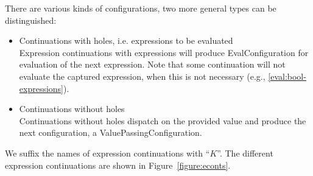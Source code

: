\documentclass{article}
\begin{document}
There are various kinds of configurations, two more general types can be distinguished:
\begin{itemize}
\item Continuations with holes, i.e. expressions to be evaluated\\
Expression continuations with expressions will produce EvalConfiguration for evaluation of the next expression.
Note that some continuation will not evaluate the captured expression, when this is not necessary (e.g., \ref{eval:bool-expressions}).

\item Continuations without holes\\
Continuations without holes dispatch on the provided value and produce the next configuration, a ValuePassingConfiguration.
\end{itemize}
We suffix the names of expression continuations with ``$K$''.
The different expression continuations are shown in Figure~\ref{figure:econts}.
%
\newcommand{\ExceptionHandlersRest}{\handler,\,\cstrace,\,\cex}
\newcommand{\ExceptionHandlers}{\strace,\,\handler,\,\cstrace,\,\cex}
\newcommand{\VarSetK}[3]{\mathrm{VarSetK}({#1},\,{#2},\,{#3})}
\newcommand{\ExpressionsK}[3]{\mathrm{ExpressionsK}({#1},\,{#2},\,\ExceptionHandlers,\,{#3})}
%
\newcommand{\NotK}[1]{\mathrm{NotK}({#1})}
\newcommand{\AndK}[3]{\mathrm{AndK}({#1},\,{#2},\,\ExceptionHandlers,\,{#3})}
\newcommand{\OrK}[3]{\mathrm{OrK}({#1},\,{#2},\,\ExceptionHandlers,\,{#3})}
\newcommand{\ConditionalK}[4]{\mathrm{ConditionalK}({#1},\,{#2},\,{#3},\,\ExceptionHandlers,\,{#4})}
%
\newcommand{\LetK}[4]{\mathrm{LetK}({#1},\,{#2},\,{#3},\,\ExceptionHandlers,\,{#4})}
%
\newcommand{\IsExpressionK}{\mathrm{IsExpressionK}(\tt{T},\,\econt)}
\newcommand{\AsExpressionK}{\mathrm{AsExpressionK}(\tt{T},\,\strace,\,\handler,\,\econt)}
%
\newcommand{\StaticGetK}{\mathrm{StaticGetK}(\membermeta,\,\econt)}
\newcommand{\StaticSetK}{\mathrm{StaticSetK}(\membermeta,\,\econt)}
\newcommand{\PropertyGetK}{\mathrm{PropertyGetK}(\idmeta,\,\ExceptionHandlers,\,\econt)}
\newcommand{\PropertySetK}{\mathrm{PropertySetK}(\idmeta,\,\expressionmeta_1,\,\env,\,\ExceptionHandlers,\,\econt)}
\newcommand{\PropertySetVK}{\mathrm{PropertySetValueK}(\val_0,\,\idmeta,\,\ExceptionHandlers\,\econt)}
\newcommand{\DPropertyGetK}{\mathrm{DPropertyGetK}(\membermeta,\,\ExceptionHandlers,\,\econt)}
\newcommand{\DirectPropertySetK}{\mathrm{DPropertySetK}(\membermeta,\,\expressionmeta_1,\,\env,\,\ExceptionHandlers,\,\econt)}
\newcommand{\DPropertySetVK}{\mathrm{DPropertySetValueK}(\val_0,\,\membermeta,\,\ExceptionHandlers,\,\econt)}
\end{document}
